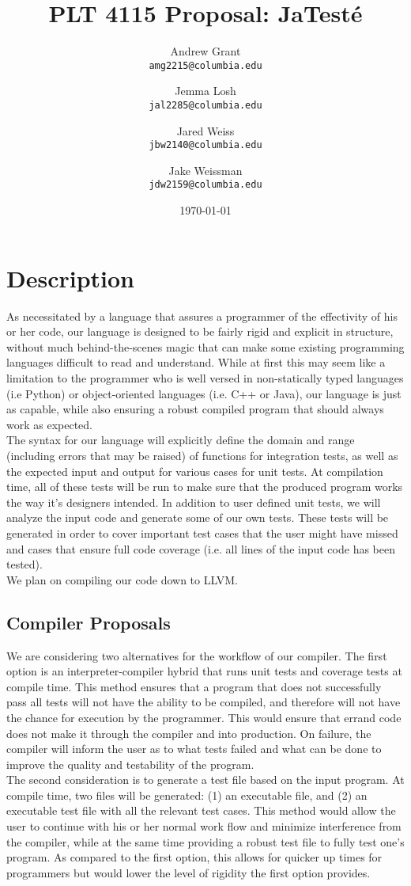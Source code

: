 \documentclass{article}
\title{PLT 4115 Proposal: \textbf{JaTest\'{e}}}
\author{
	Andrew Grant\\
	\texttt{amg2215@columbia.edu}
	\and
	Jemma Losh\\
	\texttt{jal2285@columbia.edu}
	\and
	Jared Weiss\\
	\texttt{jbw2140@columbia.edu}
	\and
	Jake Weissman\\
	\texttt{jdw2159@columbia.edu}
}
\date{\today}
\begin{document}
\maketitle

\section{Description}
As necessitated by a language that assures a programmer of the effectivity of his or her code, our language is designed to be fairly rigid and explicit in structure, without much behind-the-scenes magic that can make some existing programming languages difficult to read and understand. While at first this may seem like a limitation to the programmer who is well versed in non-statically typed languages (i.e Python) or object-oriented languages (i.e. C++ or Java), our language is just as capable, while also ensuring a robust compiled program that should always work as expected. 
\\
The syntax for our language will explicitly define the domain and range (including errors that may be raised) of functions for integration tests, as well as the expected input and output for various cases for unit tests. At compilation time, all of these tests will be run to make sure that the produced program works the way it's designers intended. In addition to user defined unit tests, we will analyze the input code and generate some of our own tests. These tests will be generated in order to cover important test cases that the user might have missed and cases that ensure full code coverage (i.e. all lines of the input code has been tested).
\\
We plan on compiling our code down to LLVM. 

\subsection{Compiler Proposals}
We are considering two alternatives for the workflow of our compiler. The first option is an interpreter-compiler hybrid that runs unit tests and coverage tests at compile time. This method ensures that a program that does not successfully pass all tests will not have the ability to be compiled, and therefore will not have the chance for execution by the programmer. This would ensure that errand code does not make it through the compiler and into production. On failure, the compiler will inform the user as to what tests failed and what can be done to improve the quality and testability of the program. \\
The second consideration is to generate a test file based on the input program. At compile time, two files will be generated: (1) an executable file, and (2) an executable test file with all the relevant test cases. This method would allow the user to continue with his or her normal work flow and minimize interference from the compiler, while at the same time providing a robust test file to fully test one's program. As compared to the first option, this allows for quicker up times for programmers but would lower the level of rigidity the first option provides. 
\end{document}
